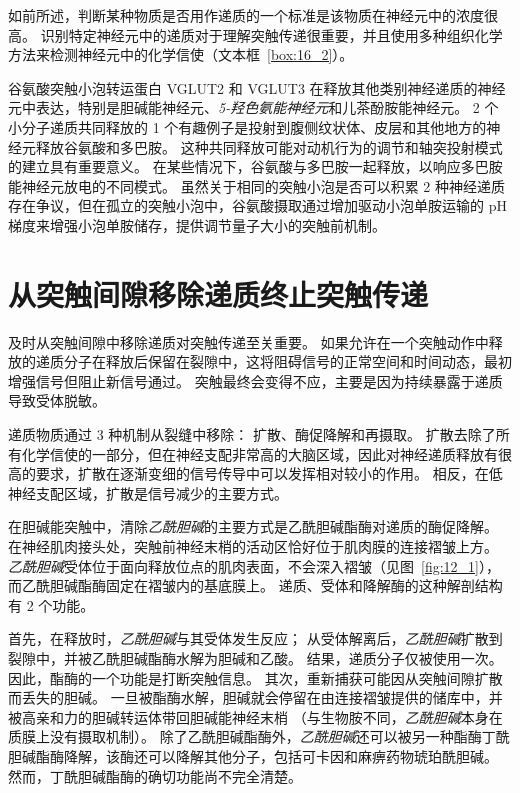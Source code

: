如前所述，判断某种物质是否用作递质的一个标准是该物质在神经元中的浓度很高。
识别特定神经元中的递质对于理解突触传递很重要，并且使用多种组织化学方法来检测神经元中的化学信使（文本框~\ref{box:16_2}）。


谷氨酸突触小泡转运蛋白 VGLUT2 和 VGLUT3 在释放其他类别神经递质的神经元中表达，特别是胆碱能神经元、\textit{5-羟色氨能神经元}和儿茶酚胺能神经元。
2 个小分子递质共同释放的 1 个有趣例子是投射到腹侧纹状体、皮层和其他地方的神经元释放谷氨酸和多巴胺。
这种共同释放可能对动机行为的调节和轴突投射模式的建立具有重要意义。
在某些情况下，谷氨酸与多巴胺一起释放，以响应多巴胺能神经元放电的不同模式。
虽然关于相同的突触小泡是否可以积累 2 种神经递质存在争议，但在孤立的突触小泡中，谷氨酸摄取通过增加驱动小泡单胺运输的 pH 梯度来增强小泡单胺储存，提供调节量子大小的突触前机制。



\section{从突触间隙移除递质终止突触传递}

及时从突触间隙中移除递质对突触传递至关重要。
如果允许在一个突触动作中释放的递质分子在释放后保留在裂隙中，这将阻碍信号的正常空间和时间动态，最初增强信号但阻止新信号通过。
突触最终会变得不应，主要是因为持续暴露于递质导致受体脱敏。


递质物质通过 3 种机制从裂缝中移除：
扩散、酶促降解和再摄取。
扩散去除了所有化学信使的一部分，但在神经支配非常高的大脑区域，因此对神经递质释放有很高的要求，扩散在逐渐变细的信号传导中可以发挥相对较小的作用。
相反，在低神经支配区域，扩散是信号减少的主要方式。


在胆碱能突触中，清除\textit{乙酰胆碱}的主要方式是乙酰胆碱酯酶对递质的酶促降解。
在神经肌肉接头处，突触前神经末梢的活动区恰好位于肌肉膜的连接褶皱上方。
\textit{乙酰胆碱}受体位于面向释放位点的肌肉表面，不会深入褶皱（见图~\ref{fig:12_1}），而乙酰胆碱酯酶固定在褶皱内的基底膜上。
递质、受体和降解酶的这种解剖结构有 2 个功能。


首先，在释放时，\textit{乙酰胆碱}与其受体发生反应；
从受体解离后，\textit{乙酰胆碱}扩散到裂隙中，并被乙酰胆碱酯酶水解为胆碱和乙酸。
结果，递质分子仅被使用一次。
因此，酯酶的一个功能是打断突触信息。
其次，重新捕获可能因从突触间隙扩散而丢失的胆碱。
一旦被酯酶水解，胆碱就会停留在由连接褶皱提供的储库中，并被高亲和力的胆碱转运体带回胆碱能神经末梢
（与生物胺不同，\textit{乙酰胆碱}本身在质膜上没有摄取机制）。
除了乙酰胆碱酯酶外，\textit{乙酰胆碱}还可以被另一种酯酶丁酰胆碱酯酶降解，该酶还可以降解其他分子，包括可卡因和麻痹药物琥珀酰胆碱。
然而，丁酰胆碱酯酶的确切功能尚不完全清楚。


